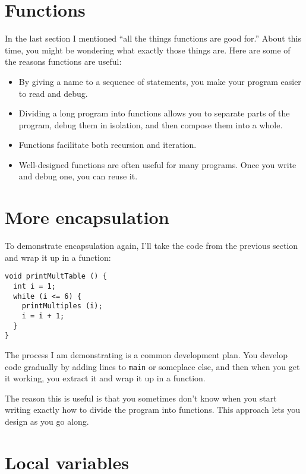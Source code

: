 \section{Functions}

In the last section I mentioned ``all the things functions
are good for.''  About this time, you might be wondering
what exactly those things are.  Here are some of the reasons
functions are useful:

\begin{itemize}

\item By giving a name to a sequence of statements, you make
your program easier to read and debug.

\item Dividing a long program into functions allows you to
separate parts of the program, debug them in isolation, and
then compose them into a whole.

\item Functions facilitate both recursion and iteration.

\item Well-designed functions are often useful for many programs.
Once you write and debug one, you can reuse it.

\end{itemize}

\section{More encapsulation}

To demonstrate encapsulation again, I'll take the code
from the previous section and wrap it up in a function:

\begin{verbatim}
void printMultTable () {
  int i = 1;
  while (i <= 6) {
    printMultiples (i);
    i = i + 1;
  }
}
\end{verbatim}
%
The process I am demonstrating is a common 
development plan.  You develop code gradually by adding
lines to {\tt main} or someplace else, and then when you get
it working, you extract it and wrap it up in a function.

The reason this is useful is that you sometimes don't know
when you start writing exactly how to divide the program into
functions.  This approach lets you design as you go along.

\section{Local variables}

